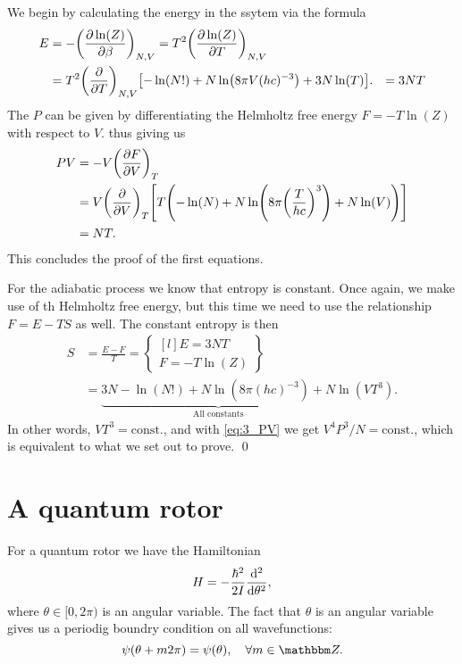 \documentclass[11pt,letter, swedish, english
]{article}
\begin{document}
We begin by calculating the energy in the ssytem via the formula
\begin{equation}\label{eq:3_E}
\begin{aligned}
E&=-\qty(\pdv{\ln(Z)}{\beta})_{N,V}=T^2\qty(\pdv{\ln(Z)}{T})_{N,V}\\
&=T^2\qty(\pdv{T})_{N,V}\qty[-\ln(N!)+N\ln(8\pi V (hc)^{-3})+3N\ln(T)].
&=3NT
\end{aligned}
\end{equation}
The $P$ can be given by differentiating the Helmholtz free energy
$F=-T\ln(Z)$ with respect to $V$.
thus giving us
\begin{equation}\label{eq:3_PV}
\begin{aligned}
PV&=-V\qty(\pdv{F}{V})_{T}\\
&=V\qty(\pdv{V})_{T}
\qty[T\qty(-\ln(N)+N\ln(8\pi\qty(\frac{T}{hc})^3) + N\ln(V))]\\
&=NT.
\end{aligned}
\end{equation}
This concludes the proof of the first equations.

For the adiabatic process we know that entropy is constant. Once again,
we make use of th Helmholtz free energy, but this time we need to use
the relationship $F=E-TS$ as well. The constant entropy is then
\begin{equation}
\begin{aligned}
S&=\frac{E-F}{T}=\begin{Bmatrix*}[l]
E=3NT\\F=-T\ln(Z)
\end{Bmatrix*}\\
&=\underbrace{3N-\ln(N!) +N\ln(8\pi(hc)^{-3})+N}_\text{All constants}
\ln(VT^3).
\end{aligned}
\end{equation}
In other words, $VT^3=\text{const.}$, and with \eqref{eq:3_PV} we get
$V^4P^3/N=\text{const.}$, which is equivalent to what we set out to
prove. 
\qed


\section{A quantum rotor}
For a quantum rotor we have the Hamiltonian
\begin{equation}
H = -\frac{\hbar^2}{2I} \dv[2]{\theta},
\end{equation}
where $\theta\in[0,2\pi)$ is an angular variable. The fact that
$\theta$ is an angular variable gives us a periodig boundry condition
on all wavefunctions:
\begin{equation}
\psi(\theta+m2\pi)=\psi(\theta)\qcomma \forall m\in\Z.
\end{equation}
\end{document}
